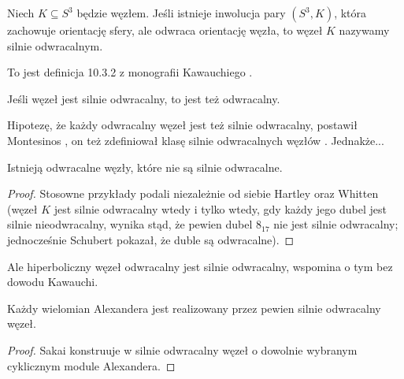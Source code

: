 \begin{definition}
    Niech $K \subseteq S^3$ będzie węzłem.
    Jeśli istnieje inwolucja pary $(S^3, K)$, która zachowuje orientację sfery, ale odwraca orientację węzła, to węzeł $K$ nazywamy silnie odwracalnym.
\end{definition}

To jest definicja 10.3.2 z monografii Kawauchiego \cite{kawauchi1996}.

\begin{proposition}
    Jeśli węzeł jest silnie odwracalny, to jest też odwracalny.
\end{proposition}

Hipotezę, że każdy odwracalny węzeł jest też silnie odwracalny, postawił Montesinos \cite[problem 1.6]{kirby1978}, on też zdefiniował klasę silnie odwracalnych węzłów \cite{montesinos1975}.
%
Jednakże...

\begin{proposition}
    Istnieją odwracalne węzły, które nie są silnie odwracalne.
\end{proposition}

\begin{proof}
%
%
    Stosowne przykłady podali niezależnie od siebie Hartley \cite[s. 183]{hartley1980} oraz Whitten \cite{whitten1981} (węzeł $K$ jest silnie odwracalny wtedy i tylko wtedy, gdy każdy jego dubel jest silnie nieodwracalny, wynika stąd, że pewien dubel $8_{17}$ nie jest silnie odwracalny; jednocześnie Schubert \cite[s. 235]{schubert1953} pokazał, że duble są odwracalne).
\end{proof}

Ale hiperboliczny węzeł odwracalny jest silnie odwracalny, wspomina o tym bez dowodu Kawauchi.

\begin{proposition}
    Każdy wielomian Alexandera jest realizowany przez pewien silnie odwracalny węzeł.
\end{proposition}

\begin{proof}
%
    Sakai konstruuje w \cite{sakai1983} silnie odwracalny węzeł o dowolnie wybranym cyklicznym module Alexandera.
\end{proof}


